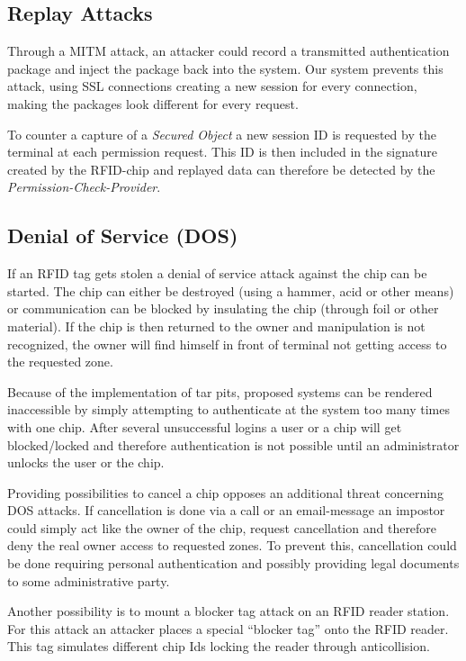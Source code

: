 \documentclass[12pt,a4paper,titlepage,oneside]{scrartcl}
\begin{document}
\subsection{Replay Attacks}
Through a MITM attack, an attacker could record a transmitted authentication package and inject the package back into the system. Our system prevents this attack, using SSL connections creating a new session for every connection, making the packages look different for every request.

To counter a capture of a \emph{Secured Object} a new session ID is requested by the terminal at each permission request. This ID is then included in the signature created by the RFID-chip and replayed data can therefore be detected by the \emph{Permission-Check-Provider}.

\subsection{Denial of Service (DOS)}
If an RFID tag gets stolen a denial of service attack against the chip can be started. The chip can either be destroyed (using a hammer, acid or other means) or communication can be blocked by insulating the chip (through foil or other material). If the chip is then returned to the owner and manipulation is not recognized, the owner will find himself in front of terminal not getting access to the requested zone.

Because of the implementation of tar pits, proposed systems can be rendered inaccessible by simply attempting to authenticate at the system too many times with one chip. After several unsuccessful logins a user or a chip will get blocked/locked and therefore authentication is not possible until an administrator unlocks the user or the chip.

Providing possibilities to cancel a chip opposes an additional threat concerning DOS attacks. If cancellation is done via a call or an email-message an impostor could simply act like the owner of the chip, request cancellation and therefore deny the real owner access to requested zones. To prevent this, cancellation could be done requiring personal authentication and possibly providing legal documents to some administrative party.

Another possibility is to mount a blocker tag attack on an RFID reader station. For this attack an attacker places a special “blocker tag” onto the RFID reader. This tag simulates different chip Ids locking the reader through anticollision.
\end{document}
